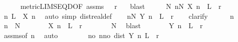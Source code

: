 \begin{isabellebody}
\ \ \ \ \isamarkupfalse%
\ metric{\isacharunderscore}{\kern0pt}LIMSEQ{\isacharunderscore}{\kern0pt}D{\isacharbrackleft}{\kern0pt}OF\ assms{\isacharparenleft}{\kern0pt}{}{\isacharparenright}{\kern0pt}\ {\isacartoucheopen}{}\ {\isacharless}{\kern0pt}\ r{\isacartoucheclose}{\isacharbrackright}{\kern0pt}\ \ \isamarkupfalse%
\ blast\isanewline
\ \ \isamarkupfalse%
\ \isamarkupfalse%
\ N{\isacharcolon}{\kern0pt}\ {\isachardoublequoteopen}{\isasymforall}n{\isasymge}N{\isachardot}{\kern0pt}\ X\ n\ {\isacharminus}{\kern0pt}\ L\ {\isacharless}{\kern0pt}\ r{\isachardoublequoteclose}\isanewline
\ \ \ \ \isamarkupfalse%
\ {\isacartoucheopen}{\isasymAnd}n{\isachardot}{\kern0pt}\ L\ {\isasymle}\ X\ n{\isacartoucheclose}\ \isamarkupfalse%
\ {\isacharparenleft}{\kern0pt}auto\ simp{\isacharcolon}{\kern0pt}\ dist{\isacharunderscore}{\kern0pt}real{\isacharunderscore}{\kern0pt}def{\isacharparenright}{\kern0pt}\isanewline
\ \ \isamarkupfalse%
\ {\isachardoublequoteopen}{\isasymforall}n{\isasymge}N{\isachardot}{\kern0pt}\ Y\ n\ {\isacharminus}{\kern0pt}\ L\ {\isacharless}{\kern0pt}\ r{\isachardoublequoteclose}\isanewline
\ \ \isamarkupfalse%
\ clarify\isanewline
\ \ \ \ \isamarkupfalse%
\ n\ \isamarkupfalse%
\ {\isacartoucheopen}n\ {\isasymge}\ N{\isacartoucheclose}\isanewline
\ \ \ \ \isamarkupfalse%
\ \isamarkupfalse%
\ {\isachardoublequoteopen}X\ n\ {\isacharminus}{\kern0pt}\ L\ {\isacharless}{\kern0pt}\ r{\isachardoublequoteclose}\isanewline
\ \ \ \ \ \ \isamarkupfalse%
\ N\ \isamarkupfalse%
\ blast\isanewline
\ \ \ \ \isamarkupfalse%
\ \isamarkupfalse%
\ {\isachardoublequoteopen}Y\ n\ {\isacharminus}{\kern0pt}\ L\ {\isacharless}{\kern0pt}\ r{\isachardoublequoteclose}\isanewline
\ \ \ \ \ \ \isamarkupfalse%
\ assms{\isacharparenleft}{\kern0pt}{}{\isacharparenright}{\kern0pt}{\isacharbrackleft}{\kern0pt}of\ n{\isacharbrackright}{\kern0pt}\ \isamarkupfalse%
\ auto\isanewline
\ \ \isamarkupfalse%
\isanewline
\ \ \isamarkupfalse%
\ \isamarkupfalse%
\ {\isachardoublequoteopen}{\isasymexists}no{\isachardot}{\kern0pt}\ {\isasymforall}n{\isasymge}no{\isachardot}{\kern0pt}\ dist\ {\isacharparenleft}{\kern0pt}Y\ n{\isacharparenright}{\kern0pt}\ L\ {\isacharless}{\kern0pt}\ r{\isachardoublequoteclose}\isanewline

\end{isabellebody}
